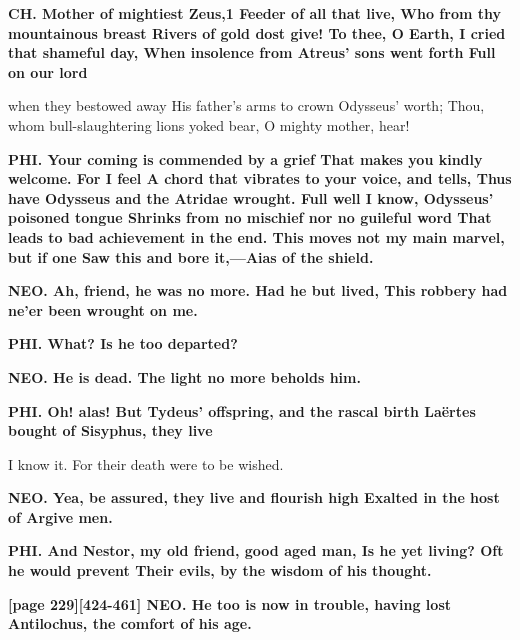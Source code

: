 \documentclass[11pt,letter]{book}
\begin{document}
\par \textbf{CH. Mother of mightiest Zeus,1 Feeder of all that live, Who from thy mountainous breast Rivers of gold dost give! To thee, O Earth, I cried that shameful day, When insolence from Atreus’ sons went forth Full on our lord}
\par   when they bestowed away His father’s arms to crown Odysseus’ worth; Thou, whom bull-slaughtering lions yoked bear, O mighty mother, hear!

\par \textbf{PHI. Your coming is commended by a grief That makes you kindly welcome. For I feel A chord that vibrates to your voice, and tells, Thus have Odysseus and the Atridae wrought. Full well I know, Odysseus’ poisoned tongue Shrinks from no mischief nor no guileful word That leads to bad achievement in the end. This moves not my main marvel, but if one Saw this and bore it,—Aias of the shield.}
\par 

\par \textbf{NEO. Ah, friend, he was no more. Had he but lived, This robbery had ne’er been wrought on me.}
\par 

\par \textbf{PHI. What? Is he too departed?}
\par 

\par \textbf{NEO. He is dead. The light no more beholds him.}
\par 

\par \textbf{PHI. Oh! alas! But Tydeus’ offspring, and the rascal birth Laërtes bought of Sisyphus, they live}
\par   I know it. For their death were to be wished.

\par \textbf{NEO. Yea, be assured, they live and flourish high Exalted in the host of Argive men.}
\par 

\par \textbf{PHI. And Nestor, my old friend, good aged man, Is he yet living? Oft he would prevent Their evils, by the wisdom of his thought.}
\par 

\par \textbf{[page 229][424-461] NEO. He too is now in trouble, having lost Antilochus, the comfort of his age.}
\par 
\end{document}
